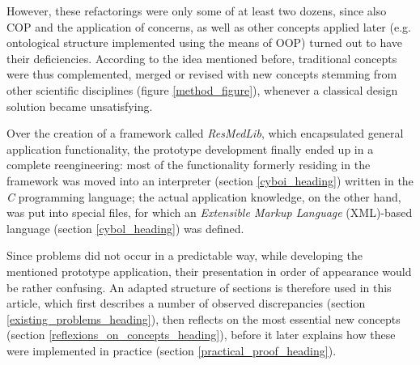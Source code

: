 However, these refactorings were only some of at least two dozens, since also
COP and the application of concerns, as well as other concepts applied later
(e.g. ontological structure implemented using the means of OOP) turned out to
have their deficiencies. According to the idea mentioned before, traditional
concepts were thus complemented, merged or revised with new concepts stemming
from other scientific disciplines (figure \ref{method_figure}), whenever a
classical design solution became unsatisfying.

Over the creation of a framework called \emph{ResMedLib}, which encapsulated
general application functionality, the prototype development finally ended up
in a complete reengineering: most of the functionality formerly residing in the
framework was moved into an interpreter (section \ref{cyboi_heading}) written
in the \emph{C} programming language; the actual application knowledge, on the
other hand, was put into special files, for which an
\emph{Extensible Markup Language} (XML)-based language (section
\ref{cybol_heading}) was defined.

Since problems did not occur in a predictable way, while developing the
mentioned prototype application, their presentation in order of appearance
would be rather confusing. An adapted structure of sections is therefore used
in this article, which first describes a number of observed discrepancies
(section \ref{existing_problems_heading}), then reflects on the most essential
new concepts (section \ref{reflexions_on_concepts_heading}), before it later
explains how these were implemented in practice (section
\ref{practical_proof_heading}).
